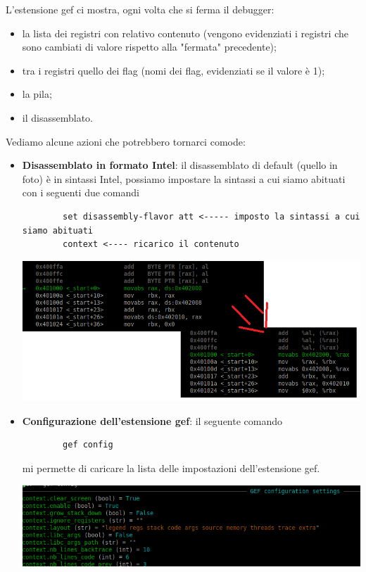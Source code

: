 L'estensione gef ci mostra, ogni volta che si ferma il debugger:
\begin{itemize}
	\item la lista dei registri con relativo contenuto (vengono evidenziati i registri che sono cambiati di valore rispetto alla "fermata" precedente);
	\item tra i registri quello dei flag (nomi dei flag, evidenziati se il valore è 1);
	\item la pila;
	\item il disassemblato.
\end{itemize}
Vediamo alcune azioni che potrebbero tornarci comode:
\begin{itemize}
	\item \textbf{Disassemblato in formato Intel}: il disassemblato di default (quello in foto) è in sintassi Intel, possiamo impostare la sintassi a cui siamo abituati con i seguenti due comandi
	\begin{verbatim}
		set disassembly-flavor att <----- imposto la sintassi a cui siamo abituati
		context <---- ricarico il contenuto
	\end{verbatim}
	\begin{center}
		\includegraphics[scale=.9]{img/145.PNG}
	\end{center}
	\item \textbf{Configurazione dell'estensione gef}: il seguente comando
	\begin{verbatim}
		gef config
	\end{verbatim}
	mi permette di caricare la lista delle impostazioni dell'estensione gef.
	\begin{center}
		\includegraphics{img/146.PNG}

\end{center}
\end{itemize}
